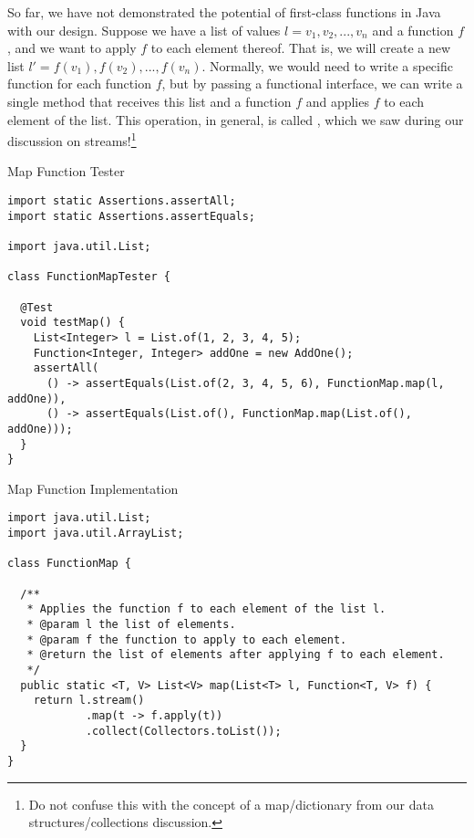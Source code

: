 So far, we have not demonstrated the potential of first-class functions in Java with our design. Suppose we have a list of  values $l=v_1, v_2, ..., v_n$ and a function $f$, and we want to apply $f$ to each element thereof. That is, we will create a new list $l'=f(v_1), f(v_2), ..., f(v_n)$. Normally, we would need to write a specific function for each function $f$, but by passing a functional interface, we can write a single method that receives this list and a function $f$ and applies $f$ to each element of the list. This operation, in general, is called , which we saw during our discussion on streams!\footnote{Do not confuse this with the concept of a map/dictionary from our data structures/collections discussion.}

\begin{cl}[]{Map Function Tester}
\begin{lstlisting}[language=MyJava]
import static Assertions.assertAll;
import static Assertions.assertEquals;

import java.util.List;

class FunctionMapTester {

  @Test
  void testMap() {
    List<Integer> l = List.of(1, 2, 3, 4, 5);
    Function<Integer, Integer> addOne = new AddOne();
    assertAll(
      () -> assertEquals(List.of(2, 3, 4, 5, 6), FunctionMap.map(l, addOne)),
      () -> assertEquals(List.of(), FunctionMap.map(List.of(), addOne)));
  }
}
\end{lstlisting}
\end{cl}

\begin{cl}[]{Map Function Implementation}
\begin{lstlisting}[language=MyJava]
import java.util.List;
import java.util.ArrayList;

class FunctionMap {

  /**
   * Applies the function f to each element of the list l.
   * @param l the list of elements.
   * @param f the function to apply to each element.
   * @return the list of elements after applying f to each element.
   */
  public static <T, V> List<V> map(List<T> l, Function<T, V> f) {
    return l.stream()
            .map(t -> f.apply(t))
            .collect(Collectors.toList());
  }
}
\end{lstlisting}
\end{cl}


